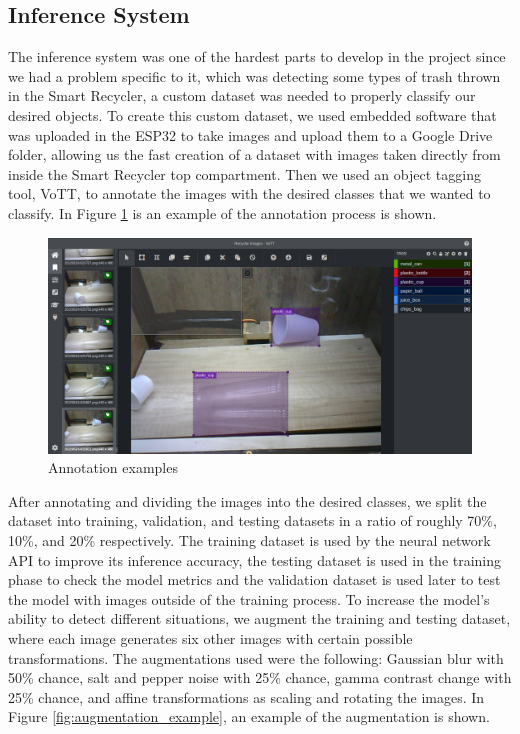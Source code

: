 \documentclass[a4paper,11pt]{article}
\begin{document}
\subsection{Inference System}
The inference system was one of the hardest parts to develop in the project since we had a problem specific to it, which was detecting some types of trash thrown in the Smart Recycler, a custom dataset was needed to properly classify our desired objects. To create this custom dataset, we used embedded software that was uploaded in the ESP32 to take images and upload them to a Google Drive folder, allowing us the fast creation of a dataset with images taken directly from inside the Smart Recycler top compartment. Then we used an object tagging tool, VoTT, to annotate the images with the desired classes that we wanted to classify. In Figure \ref{fig:annotation_example} is an example of the annotation process is shown.

\begin{figure}[H]
  \centering
  \includegraphics[width=12.5cm]{Figures/annotation_example.png}
  \caption{\small{Annotation examples}}
  \label{fig:annotation_example}
\end{figure}

After annotating and dividing the images into the desired classes, we split the dataset into training, validation, and testing datasets in a ratio of roughly 70\%, 10\%, and 20\% respectively. The training dataset is used by the neural network API to improve its inference accuracy, the testing dataset is used in the training phase to check the model metrics and the validation dataset is used later to test the model with images outside of the training process. To increase the model’s ability to detect different situations, we augment the training and testing dataset, where each image generates six other images with certain possible transformations. The augmentations used were the following: Gaussian blur with 50\% chance, salt and pepper noise with 25\% chance, gamma contrast chan\-ge with 25\% chance, and affine transformations as scaling and rotating the images. In Figure \ref{fig:augmentation_example}, an example of the augmentation is shown.
\end{document}
